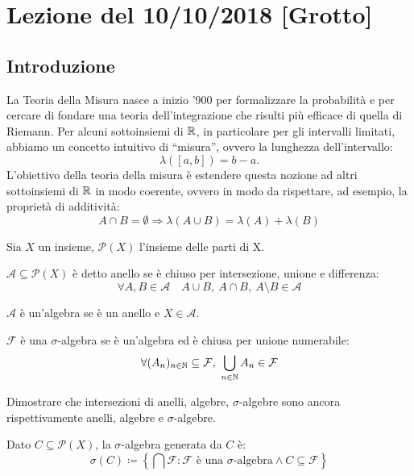 \section{Lezione del 10/10/2018 [Grotto]}
\subsection{Introduzione}
La Teoria della Misura nasce a inizio '900 per formalizzare la probabilità e per cercare di fondare una teoria dell'integrazione che risulti più efficace di quella di Riemann. Per alcuni sottoinsiemi di $\mathbb{R}$, in particolare per gli intervalli limitati, abbiamo un concetto intuitivo di ``misura'', ovvero la lunghezza dell'intervallo:
\[ \lambda\left([a,b]\right) = b-a. \]
L'obiettivo della teoria della misura è estendere questa nozione ad altri sottoinsiemi di $\mathbb{R}$ in modo coerente, ovvero in modo da rispettare, ad esempio, la proprietà di additività:
\[ A \cap B = \emptyset \Rightarrow \lambda(A\cup B) = \lambda(A) + \lambda(B) \]

Sia $X$ un insieme, $\mathscr{P}(X)$ l'insieme delle parti di X.

\begin{definition}[anello]
	$\mathcal{A} \subseteq \mathscr{P}(X)$ è detto anello se è chiuso per intersezione, unione e differenza:
	\[ \forall A, B \in \mathcal A \quad A\cup B,\ A\cap B,\ A\setminus B \in \mathcal{A} \]
\end{definition}

\begin{definition}[algebra]
	$\mathcal{A}$ è un'algebra se è un anello e $X\in \mathcal{A}$.
\end{definition}

\begin{definition}
	$\mathcal{F} $ è una $\sigma$-algebra se è un'algebra ed è chiusa per unione numerabile:
	\[ \forall (A_n)_{n\in\N}\subseteq \mathcal{F},\ \bigcup_{n\in \N} A_n \in \mathcal{F} \]
\end{definition}

\begin{exercise}
	Dimostrare che intersezioni di anelli, algebre, $\sigma$-algebre sono ancora rispettivamente anelli, algebre e $\sigma$-algebre.
\end{exercise}

\begin{definition}
	Dato $C\subseteq \mathscr{P}(X)$, la $\sigma$-algebra generata da $C$ è:
	\[ \sigma(C) \coloneqq \left\{\bigcap \mathcal{F}: \mathcal{F} \text{ è una $\sigma$-algebra} \wedge C\subseteq \mathcal{F} \right\} \]
\end{definition}

